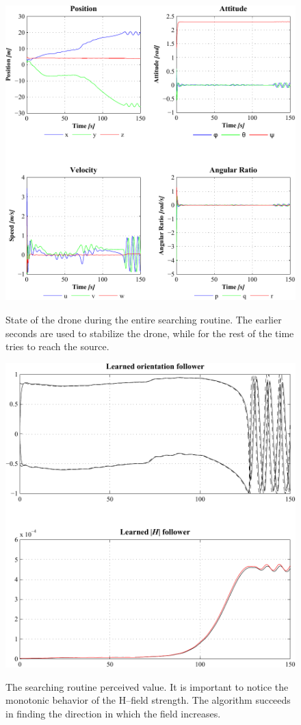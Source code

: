 \begin{figure}[f]
	\centering
	\includegraphics[]{ch4/img/State.pdf}
\label{fig:state}
\caption{State of the drone during the entire searching routine. The earlier seconds are used to stabilize the drone, while for the rest of the time tries to reach the source.}
\end{figure}

\begin{figure}[f]
	\centering
	\includegraphics[]{ch4/img/Searching.pdf}
\label{fig:searching}
\caption{The searching routine perceived value. It is important to notice the monotonic behavior of the H--field strength. The algorithm succeeds in finding the direction in which the field increases.}
\end{figure}

